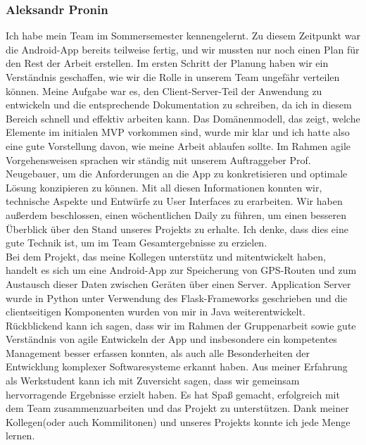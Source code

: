 \documentclass[10pt]{article}
\begin{document}
\subsubsection{Aleksandr Pronin}
    Ich habe mein Team im Sommersemester kennengelernt. Zu diesem Zeitpunkt war die Android-App bereits teilweise fertig, 
    und wir mussten nur noch einen Plan für den Rest der Arbeit erstellen.
    Im ersten Schritt der Planung haben wir ein Verständnis geschaffen, wie wir die Rolle in unserem Team ungefähr verteilen können. 
    Meine Aufgabe war es, den Client-Server-Teil der Anwendung zu entwickeln und die entsprechende Dokumentation zu schreiben,
    da ich in diesem Bereich schnell und effektiv arbeiten kann.
    Das Domänenmodell, das zeigt, welche Elemente im initialen MVP vorkommen sind, wurde mir klar und ich hatte also eine gute Vorstellung
    davon, wie meine Arbeit ablaufen sollte.  Im Rahmen agile Vorgehensweisen sprachen wir ständig mit unserem Auftraggeber Prof. Neugebauer, 
    um die Anforderungen an die App zu konkretisieren und optimale Lösung konzipieren zu können. Mit all diesen Informationen konnten wir,
    technische Aspekte und Entwürfe zu User Interfaces zu erarbeiten. Wir haben außerdem beschlossen, einen wöchentlichen Daily zu führen, 
    um einen besseren Überblick über den Stand unseres Projekts zu erhalte. Ich denke, dass dies eine gute Technik ist, um im Team Gesamtergebnisse 
    zu erzielen. \\
    Bei dem Projekt, das meine Kollegen unterstütz und mitentwickelt haben, handelt es sich um eine Android-App zur 
    Speicherung von GPS-Routen und zum Austausch dieser Daten zwischen Geräten über einen Server. Application Server wurde
    in Python unter Verwendung des Flask-Frameworks geschrieben und die clientseitigen Komponenten wurden von mir 
    in Java weiterentwickelt. \\ Rückblickend kann ich sagen, dass wir im Rahmen der Gruppenarbeit sowie  gute Verständnis von agile 
    Entwickeln der App und insbesondere ein kompetentes Management besser erfassen konnten, als auch alle Besonderheiten der Entwicklung komplexer
    Softwaresysteme erkannt haben. Aus meiner Erfahrung als Werkstudent kann ich mit Zuversicht sagen,
    dass wir gemeinsam hervorragende Ergebnisse erzielt haben. Es hat Spaß gemacht, erfolgreich mit dem Team zusammenzuarbeiten und das Projekt zu 
    unterstützen. Dank meiner Kollegen(oder auch Kommilitonen) und unseres Projekts konnte ich jede Menge lernen.
\end{document}
